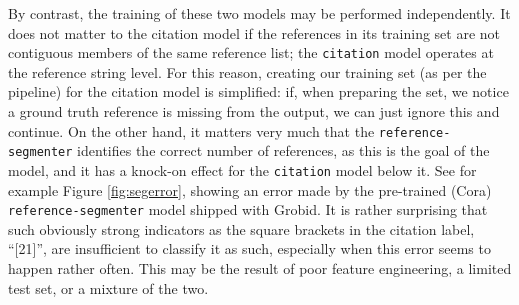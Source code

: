 \documentclass[11pt, oneside]{scrartcl}   	%
\begin{document}
By contrast, the training of these two models may be performed independently. It does not matter to the citation model if the references in its training set are not contiguous members of the same reference list; the \texttt{citation} model operates at the reference string level. For this reason, creating our training set (as per the pipeline) for the citation model is simplified: if, when preparing the set, we notice a ground truth reference is missing from the output, we can just ignore this and continue. On the other hand, it matters very much that the \texttt{reference-segmenter} identifies the correct number of references, as this is the goal of the model, and it has a knock-on effect for the \texttt{citation} model below it. See for example Figure \ref{fig:segerror}, showing an error made by the pre-trained (Cora) \texttt{reference-segmenter} model shipped with Grobid.  It is rather surprising that such obviously strong indicators as the square brackets in the citation label, ``[21]'', are insufficient to classify it as such, especially when this error seems to happen rather often. This may be the result of poor feature engineering, a limited test set, or a mixture of the two.
\end{document}
